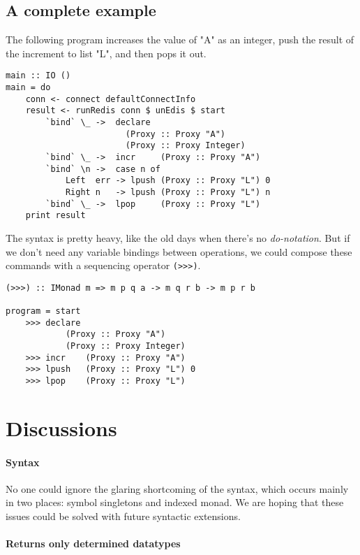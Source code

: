 \documentclass[pldi]{sigplanconf-pldi16}
\begin{document}
\subsection{A complete example}

The following program increases the value of "A" as an integer, push the result
 of the increment to list "L", and then pops it out.

\begin{verbatim}
main :: IO ()
main = do
    conn <- connect defaultConnectInfo
    result <- runRedis conn $ unEdis $ start
        `bind` \_ ->  declare
                        (Proxy :: Proxy "A")
                        (Proxy :: Proxy Integer)
        `bind` \_ ->  incr     (Proxy :: Proxy "A")
        `bind` \n ->  case n of
            Left  err -> lpush (Proxy :: Proxy "L") 0
            Right n   -> lpush (Proxy :: Proxy "L") n
        `bind` \_ ->  lpop     (Proxy :: Proxy "L")
    print result
\end{verbatim}

The syntax is pretty heavy, like the old days when there's no
 \emph{do-notation}\cite{history}. But if we don't need any variable bindings
 between operations, we could compose these commands with a sequencing operator
 \texttt{(>>>)}.

\begin{verbatim}
(>>>) :: IMonad m => m p q a -> m q r b -> m p r b

program = start
    >>> declare
            (Proxy :: Proxy "A")
            (Proxy :: Proxy Integer)
    >>> incr    (Proxy :: Proxy "A")
    >>> lpush   (Proxy :: Proxy "L") 0
    >>> lpop    (Proxy :: Proxy "L")
\end{verbatim}

\section{Discussions}
\paragraph{Syntax}
No one could ignore the glaring shortcoming of the syntax, which occurs mainly
 in two places: symbol singletons and indexed monad. We are hoping that these
 issues could be solved with future syntactic extensions.

\paragraph{Returns only determined datatypes}
\end{document}
